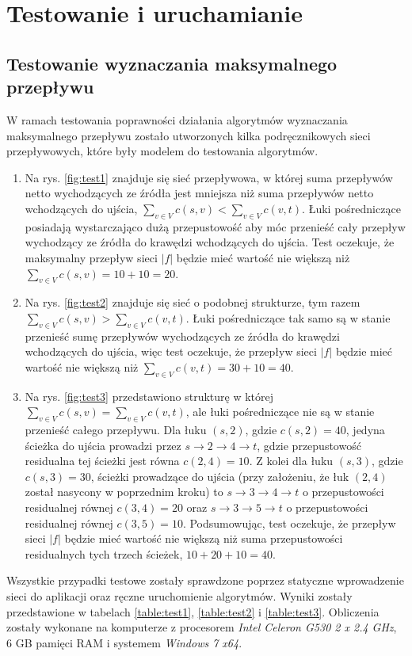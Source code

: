 \chapter{Testowanie i uruchamianie}
\section{Testowanie wyznaczania maksymalnego przepływu}\label{sec:testNetwork}
W ramach testowania poprawności działania algorytmów wyznaczania maksymalnego przepływu zostało utworzonych kilka podręcznikowych sieci przepływowych, które były modelem do testowania algorytmów.
\begin{enumerate}
	\item Na rys. \ref{fig:test1} znajduje się sieć przepływowa, w której suma przepływów netto wychodzących ze źródła jest mniejsza niż suma przepływów netto wchodzących do ujścia, $ \sum_{v\in V}{c(s,v)} < \sum_{v\in V}{c(v,t)} $. Łuki pośredniczące posiadają wystarczająco dużą przepustowość aby móc przenieść cały przepływ wychodzący ze źródła do krawędzi wchodzących do ujścia. Test oczekuje, że maksymalny przepływ sieci $ |f| $ będzie mieć wartość nie większą niż $ \sum_{v\in V}{c(s,v)}=10+10=20 $.
	\item Na rys. \ref{fig:test2} znajduje się sieć o podobnej strukturze, tym razem $ \sum_{v\in V}{c(s,v)} > \sum_{v\in V}{c(v,t)} $. Łuki pośredniczące tak samo są w stanie przenieść sumę przepływów wychodzących ze źródła do krawędzi wchodzących do ujścia, więc test oczekuje, że przepływ sieci $ |f| $ będzie mieć wartość nie większą niż $ \sum_{v\in V}{c(v,t)}=30+10=40 $.
	\item Na rys. \ref{fig:test3} przedstawiono strukturę w której $ \sum_{v\in V}{c(s,v)} = \sum_{v\in V}{c(v,t)} $, ale łuki pośredniczące nie są w stanie przenieść całego przepływu. Dla łuku $ (s, 2) $, gdzie $ c(s,2)=40 $, jedyna ścieżka do ujścia prowadzi przez $ s\rightarrow2\rightarrow4\rightarrow t $, gdzie przepustowość residualna tej ścieżki jest równa $ c(2,4)=10 $. Z kolei dla łuku $ (s, 3) $, gdzie $ c(s,3)=30 $, ścieżki prowadzące do ujścia (przy założeniu, że łuk $ (2,4) $ został nasycony w poprzednim kroku) to $ s\rightarrow3\rightarrow4\rightarrow t $ o przepustowości residualnej równej $ c(3,4)=20 $ oraz $ s\rightarrow3\rightarrow5\rightarrow t $ o przepustowości residualnej równej $ c(3,5)=10 $. Podsumowując, test oczekuje, że przepływ sieci $ |f| $ będzie mieć wartość nie większą niż suma przepustowości residualnych tych trzech ścieżek, $ 10+20+10=40 $.
\end{enumerate}
Wszystkie przypadki testowe zostały sprawdzone poprzez statyczne wprowadzenie sieci do aplikacji oraz ręczne uruchomienie algorytmów. Wyniki zostały przedstawione w tabelach \ref{table:test1}, \ref{table:test2} i \ref{table:test3}. Obliczenia zostały wykonane na komputerze z procesorem \textit{Intel Celeron G530 2 x 2.4 GHz}, 6 GB pamięci RAM i systemem \textit{Windows 7 x64}.
